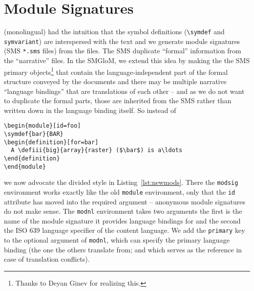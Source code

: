 \documentclass{bluenote}
\def\smglom{\textsf{SMGloM}\xspace}
\begin{document}
\section{\protect\sTeX Module Signatures}

(monolingual) \sTeX had the intuition that the symbol definitions (\lstinline|\symdef| and
\lstinline|symvariant|) are interspersed with the text and we generate \sTeX module
signatures (SMS \lstinline|*.sms| files) from the \sTeX files. The SMS duplicate
``formal'' information from the ``narrative'' \sTeX files. In the \smglom, we extend this
idea by making the the SMS primary objects\footnote{Thanks to Deyan Ginev for realizing
  this.} that contain the language-independent part of the formal structure conveyed by
the \sTeX documents and there may be multiple narrative ``language bindings'' that are
translations of each other -- and as we do not want to duplicate the formal parts, those
are inherited from the SMS rather than written down in the language binding itself. So instead of 
\begin{lstlisting}[caption=Old-Style \protect\sTeX,label=lst:oldmods]
\begin{module}[id=foo]
\symdef{bar}{BAR}
\begin{definition}[for=bar]
  A \defiii{big}{array}{raster} ($\bar$) is a\ldots
\end{definition}
\end{module}
\end{lstlisting}

we now advocate the divided style in Listing~\ref{lst:newmods}. There the \lstinline|modsig| environment works exactly like the old
\lstinline|module| environment, only that the \lstinline|id| attribute has moved into the
required argument -- anonymous module signatures do not make sense. The
\lstinline|modnl| environment takes two arguments the first is the name of the module
signature it provides language bindings for and the second the ISO 639 language specifier
of the content language. We add the \lstinline|primary| key to the optional argument of
\lstinline|modnl|, which can specify the primary language binding (the one the others
translate from; and which serves as the reference in case of translation conflicts).
\end{document}
